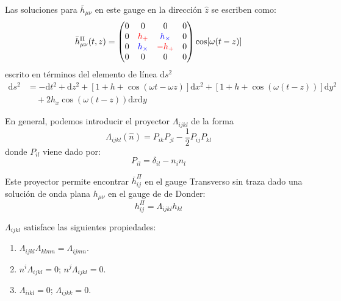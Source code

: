 \documentclass[../main]{subfiles}
\begin{document}
Las soluciones para $\bar{h}_{\mu\nu}$ en este gauge en la dirección $\hat{z}$ se escriben como:
\begin{equation}
    \bar{h}^{\Pi}_{\mu\nu}(t, z)=
    \begin{pmatrix}
        0 & 0 & 0 & 0 \\
        0 & \textcolor{red}{h_+} & \textcolor{blue}{h_{\times}} & 0 \\
        0 & \textcolor{blue}{h_\times}& \textcolor{red}{-h_+} &  0\\
        0 & 0 & 0 & 0
    \end{pmatrix}
    \cos[\omega(t-z)]
\end{equation}
escrito en términos del elemento de línea $\mathrm{d}s^2$
\begin{equation}
    \begin{split}
        \mathrm{d}s^2&=-\mathrm{d}t^2+\mathrm{d}z^2+\left[1+h+\cos(\omega t-\omega z)\right]\mathrm{d}x^2+\left[1+h+\cos(\omega(t-z))\right]\mathrm{d}y^2\\
        &\quad +2h_x\cos(\omega(t-z))\mathrm{d}x\mathrm{d}y 
    \end{split}
\end{equation}

En general, podemos introducir el proyector $\Lambda_{ijkl}$ de la forma 
\begin{equation}
    \Lambda_{ijkl}(\hat{n})=P_{ik}P_{jl}-\dfrac{1}{2}P_{ij}P_{kl}
\end{equation}
donde $P_{il}$ viene dado por:
\begin{equation}
    P_{il}=\delta_{il}-n_i n_l
\end{equation}

Este proyector permite encontrar $\bar{h}^{\Pi}_{ij}$ en el gauge Transverso sin traza dado una solución de onda plana $h_{\mu\nu}$ en el gauge de de Donder:
\begin{equation}
    h^{\Pi}_{ij}=\Lambda_{ijkl}h_{kl}
\end{equation}

$\Lambda_{ijkl}$ satisface las siguientes propiedades:
\begin{enumerate}
    \item $\Lambda_{ijkl}\Lambda_{klmn}=\Lambda_{ijmn}$.
    \item $n^{i}\Lambda_{ijkl}=0$; $n^{j}\Lambda_{ijkl}=0$.
    \item $\Lambda_{iikl}=0$; $\Lambda_{ijkk}=0$.
\end{enumerate}
\end{document}

